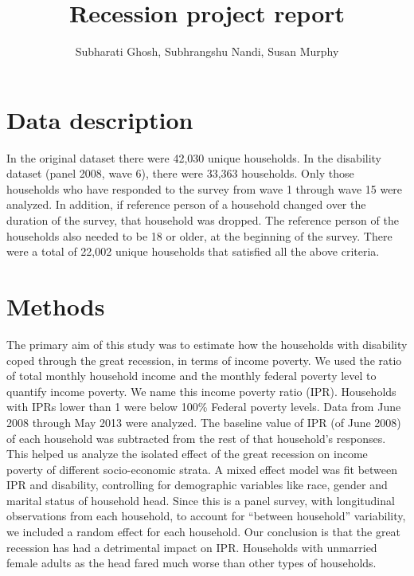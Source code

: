\documentclass[11pt]{extarticle} %
\begin{document}

\title{Recession project report}
\author{Subharati Ghosh, Subhrangshu Nandi, Susan Murphy \\
\date{}
}

\maketitle

\section{Data description}
In the original dataset there were 42,030 unique households. In the disability dataset (panel 2008, wave 6), there were 33,363 households. Only those households who have responded to the survey from wave 1 through wave 15 were analyzed. In addition, if reference person of a household changed over the duration of the survey, that household was dropped. The reference person of the households also needed to be 18 or older, at the beginning of the survey. There were a total of 22,002 unique households that satisfied all the above criteria. 

\section{Methods}
The primary aim of this study was to estimate how the households with disability coped through the great recession, in terms of income poverty. We used the ratio of total monthly household income and the monthly federal poverty level to quantify income poverty. We name this income poverty ratio (IPR).  Households with IPRs lower than 1 were below 100\% Federal poverty levels. Data from June 2008 through May 2013 were analyzed. The baseline value of IPR (of June 2008) of each household was subtracted from the rest of that household's responses. This helped us analyze the isolated effect of the great recession on income poverty of different socio-economic strata. A mixed effect model was fit between IPR and disability, controlling for demographic variables like race, gender and marital status of household head. Since this is a panel survey, with longitudinal observations from each household, to account for ``between household'' variability, we included a random effect for each household. Our conclusion is that the great recession has had a detrimental impact on IPR. Households with unmarried female adults as the head fared much worse than other types of households. 
\end{document}
